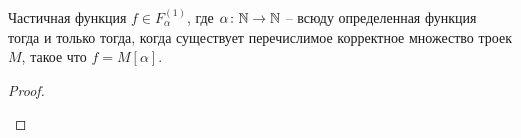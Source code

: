 \begin{thm}
	Частичная функция $ f \in F^{(1)}_{ \alpha }$, где $  \alpha \colon \mathbb{N} \to \mathbb{N}$ -- всюду определенная функция тогда и только тогда, когда существует перечислимое корректное множество троек $ M$, такое что $ f = M [ \alpha ]$.
\end{thm}
\begin{proof}
    ~\begin{description}
        \item {} 
        \item {} 
    \end{description} 
\end{proof}
